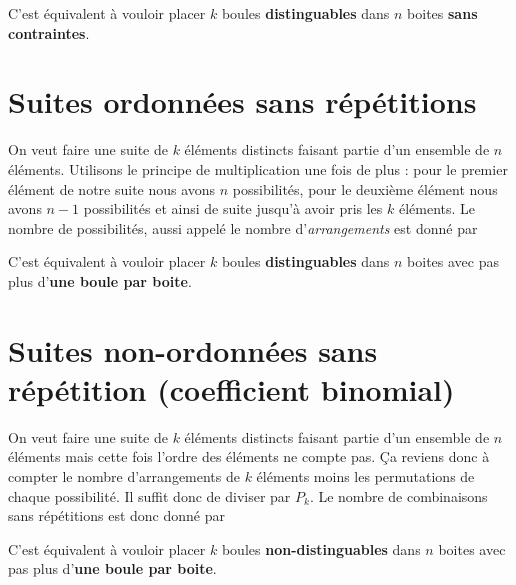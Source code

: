 \documentclass[a4paper,12pt]{report}
\theoremstyle{definition}
\renewcommand{\(}{\left(}
\renewcommand{\)}{\right)}
\renewcommand{\b}{\textbf}
\renewcommand{\d}{\textit}
\begin{document}
        C'est équivalent à vouloir placer $k$ boules \b{distinguables} dans $n$ boites \b{sans contraintes}.
    
    \section{Suites ordonnées sans répétitions}
    
        On veut faire une suite de $k$ éléments distincts faisant partie d'un ensemble de $n$ éléments. Utilisons le principe de multiplication une fois de plus : pour le premier élément de notre suite nous avons $n$ possibilités, pour le deuxième élément nous avons $n-1$ possibilités et ainsi de suite jusqu'à avoir pris les $k$ éléments. Le nombre de possibilités, aussi appelé le nombre d'\d{arrangements} est donné par
        
        \begin{center}
            \setlength{\fboxrule}{1pt}
        \end{center}
        
        C'est équivalent à vouloir placer $k$ boules \b{distinguables} dans $n$ boites avec pas plus d'\b{une boule par boite}.
    
    \section{Suites non-ordonnées sans répétition (coefficient binomial)}
    
        On veut faire une suite de $k$ éléments distincts faisant partie d'un ensemble de $n$ éléments mais cette fois l'ordre des éléments ne compte pas. Ça reviens donc à compter le nombre d'arrangements de $k$ éléments moins les permutations de chaque possibilité. Il suffit donc de diviser par $P_k$. Le nombre de combinaisons sans répétitions est donc donné par
        
        \begin{center}
            \setlength{\fboxrule}{1pt}
        \end{center}
        
        C'est équivalent à vouloir placer $k$ boules \b{non-distinguables} dans $n$ boites avec pas plus d'\b{une boule par boite}.
        
\end{document}
